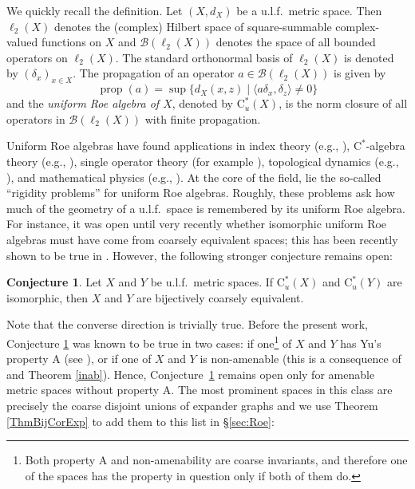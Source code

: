 \documentclass[11pt]{amsart}
\newcommand{\cstu}{\mathrm{C}^*_u}
\newcommand{\cstar}{$\mathrm{C}^*$}
\newcommand{\cB}{\mathcal{B}}
\numberwithin{equation}{section}
\theoremstyle{definition}
\newtheorem{conjecture}[theorem]{Conjecture}
\theoremstyle{remark}
\DeclareMathOperator{\propg}{prop}
\numberwithin{equation}{section}
\begin{document}
We quickly recall the definition. Let $(X,d_X)$ be a u.l.f.\ metric space. Then $\ell_2(X)$ denotes the (complex) Hilbert space of square-summable complex-valued functions on $X$ and $\cB(\ell_2(X))$ denotes the space of all bounded operators on $\ell_2(X)$. The standard orthonormal  basis of $\ell_2(X)$ is denoted by $(\delta_x)_{x\in X}$. The propagation of an operator $a\in\cB(\ell_2(X))$ is given by 
\[\propg(a)=\sup\{d_X(x,z)\mid \langle a\delta_x,\delta_z\rangle\neq 0\}\]
and the \emph{uniform Roe algebra of $X$}, denoted by $\cstu(X)$, is the norm closure of all operators in $\cB(\ell_2(X))$ with finite propagation.   

Uniform Roe algebras have found applications in index theory (e.g., \cite{Spakula:2009tg,Engel:2018vm}), \cstar-algebra theory (e.g., \cite{Rordam:2010kx,Li:2017ac}), single operator theory (for example \cite{Rabinovich:2004xe,Spakula:2014aa}), topological dynamics (e.g., \cite{Kellerhals:2013aa,Brodzki:2015kb}), and mathematical physics (e.g., \cite{Cedzich:2018wx,Kubota2017}).  At the core of the field, lie the so-called ``rigidity problems'' for uniform Roe algebras.  Roughly, these problems ask how much of the geometry of a u.l.f.\ space is remembered by its  uniform Roe algebra. For instance, it was open until very recently whether isomorphic uniform Roe algebras must have come from coarsely equivalent spaces; this has been recently shown to be true in  \cite[Theorem 1.2]{BaudierBragaFarahKhukhroVignatiWillett2021uRaRig}. However, the following stronger conjecture remains open: 

\begin{conjecture}\label{Conjecture}
Let $X$ and $Y$ be u.l.f.\ metric spaces. If $\cstu(X)$ and $\cstu(Y)$ are isomorphic, then $X$ and $Y$ are bijectively coarsely equivalent. 
\end{conjecture}

Note that the converse direction is trivially true.  Before the present work, Conjecture \ref{Conjecture}
was known to be true in two cases: if one\footnote{Both property A and non-amenability are coarse invariants, and therefore one of the spaces has the property in question only if both of them do.} of $X$ and $Y$ has Yu's property A (see \cite[Corollary 6.13]{WhiteWillett2017}), or if one of $X$ and $Y$ is non-amenable (this is a consequence of \cite[Theorem 1.2]{BaudierBragaFarahKhukhroVignatiWillett2021uRaRig} and Theorem \ref{inab}).  Hence, Conjecture~\ref{Conjecture} remains open only for amenable metric spaces without property A. The most prominent spaces in this class are precisely the coarse disjoint unions of expander graphs and we use Theorem \ref{ThmBijCorExp} to add them to this list in  \S\ref{sec:Roe}: 
\end{document}
